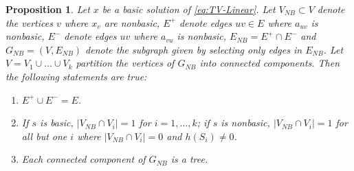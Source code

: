 \documentclass[titlepage,11pt]{article}
\newtheorem{proposition}{Proposition}
\begin{document}
\begin{proposition} \label{prop:tv-linear-basic}
    Let $x$ be a basic solution of \eqref{eq:TV-Linear}. Let $V_{NB} \subset V$ denote the vertices $v$ where $x_v$ are nonbasic, $E^+$ denote edges $uv \in E$ where $a_{uv}$ is nonbasic, $E^-$ denote edges $uv$ where $a_{vu}$ is nonbasic, $E_{NB} = E^+ \cap E^-$ and $G_{NB} = (V, E_{NB})$ denote the subgraph given by selecting only edges in $E_{NB}$. Let $V= V_1 \cup\dots \cup V_k$ partition the vertices of $G_{NB}$ into connected components. Then the following statements are true:
    \begin{enumerate}
        \item $E^+ \cup E^- = E$.
        \item If $s$ is basic, $|V_{NB} \cap V_i| = 1$ for $i=1,\ldots,k$; if $s$ is nonbasic, $|V_{NB} \cap V_i| = 1$ for all but one $i$ where $|V_{NB} \cap V_i| = 0$ and $h(S_i) \ne 0$.
        \item Each connected component of $G_{NB}$ is a tree.
    \end{enumerate}
\end{proposition}
\end{document}
